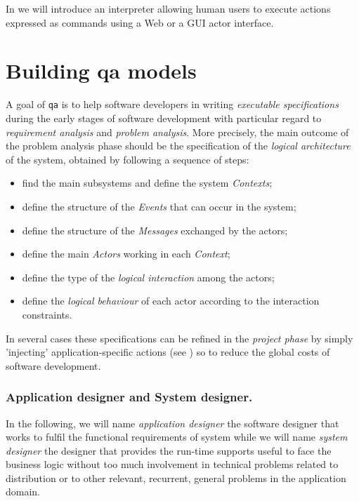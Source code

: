 In  we will introduce an interpreter allowing human users to execute actions expressed as commands using a Web or a GUI actor interface.



\section{Building qa models}

A goal of  \texttt{qa} is  to help software developers in writing \textit{executable specifications} during the early stages of software development with particular regard to \textit{requirement analysis} and \textit{problem analysis}. More precisely, the main outcome of the problem analysis phase should be the specification of the \textit{logical architecture} of the system, obtained by following a sequence of steps:

\begin{itemize}
	\item find the main subsystems and define the system \textit{Contexts};
	\item define the structure of the \textit{Events} that can occur in the system;
	\item define the structure of the \textit{Messages} exchanged by the actors;
	\item define the main \textit{Actors} working in each \textit{Context};
	\item define the type of the \textit{logical interaction} among the actors;
	\item define the \textit{logical behaviour} of each actor according to the interaction constraints.
\end{itemize}

In several cases these specifications can be refined in the \textit{project phase} by simply 'injecting' application-specific actions (see ) so to reduce the global costs of software development.

\subsubsection{Application designer and System designer.}

In the following, we will name  \textit{application designer} the software designer that works to fulfil the functional requirements of system while we will name  \textit{system designer} the designer that provides the run-time supports useful to face the business logic without too much involvement in technical problems related to distribution or to other relevant, recurrent, general problems in the application domain.



